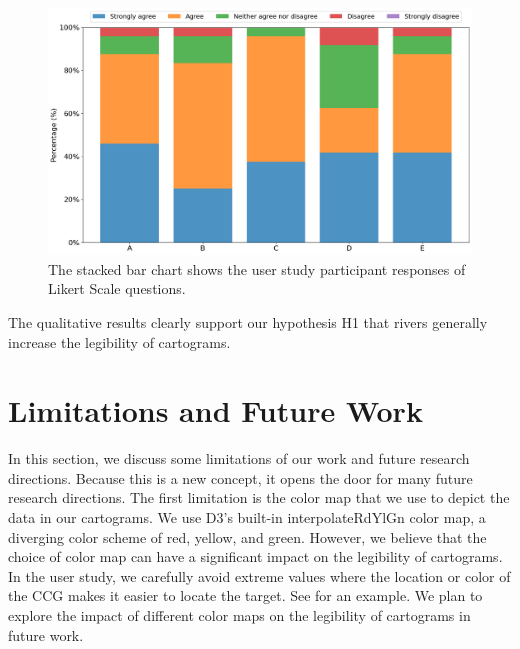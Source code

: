 \documentclass[Afour,sagev,times]{sagej}
\begin{document}
{
\begin{figure}[tb!]
    \centering
    \includegraphics[width=\columnwidth,keepaspectratio]{likert.png}
    \caption{The stacked bar chart shows the user study participant responses of Likert Scale questions.}
    \label{fig:likert}
\end{figure}
}

The qualitative results clearly support our hypothesis H1 that rivers generally increase the legibility of cartograms.

\section{Limitations and Future Work}
\label{sec:{Limitations and Future Work}}

In this section, we discuss some limitations of our work and future research directions.
Because this is a new concept, it opens the door for many future research directions.
The first limitation is the color map that we use to depict the data in our cartograms.
We use D3's built-in interpolateRdYlGn color map, a diverging color scheme of red, yellow, and green.
However, we believe that the choice of color map can have a significant impact on the legibility of cartograms.
In the user study, we carefully avoid extreme values where the location or color of the CCG makes it easier to locate the target.
See  for an example.
We plan to explore the impact of different color maps on the legibility of cartograms in future work.
\end{document}
